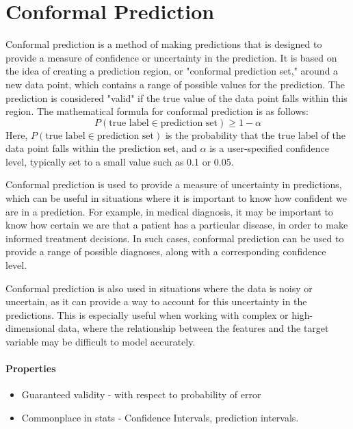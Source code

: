 \section{Conformal Prediction}
\begin{definition}
	Conformal prediction is a method of making predictions that is designed to provide a measure of confidence or uncertainty in the prediction. It is based on the idea of creating a prediction region, or "conformal prediction set," around a new data point, which contains a range of possible values for the prediction. The prediction is considered "valid" if the true value of the data point falls within this region.
	The mathematical formula for conformal prediction is as follows:
	\begin{displaymath}
		P(\text{true label} \in \text{prediction set}) \geq 1 - \alpha

	\end{displaymath}
	Here, $P(\text{true label} \in \text{prediction set})$ is the probability that the true label of the data point falls within the prediction set, and $\alpha$ is a user-specified confidence level, typically set to a small value such as 0.1 or 0.05.

	Conformal prediction is used to provide a measure of uncertainty in predictions, which can be useful in situations where it is important to know how confident we are in a prediction. For example, in medical diagnosis, it may be important to know how certain we are that a patient has a particular disease, in order to make informed treatment decisions. In such cases, conformal prediction can be used to provide a range of possible diagnoses, along with a corresponding confidence level.

	Conformal prediction is also used in situations where the data is noisy or uncertain, as it can provide a way to account for this uncertainty in the predictions. This is especially useful when working with complex or high-dimensional data, where the relationship between the features and the target variable may be difficult to model accurately.
\end{definition}
\paragraph{Properties}
\begin{itemize}
	\item Guaranteed validity - with respect to probability of error
	\item Commonplace in stats - Confidence Intervals, prediction intervals.
\end{itemize}

